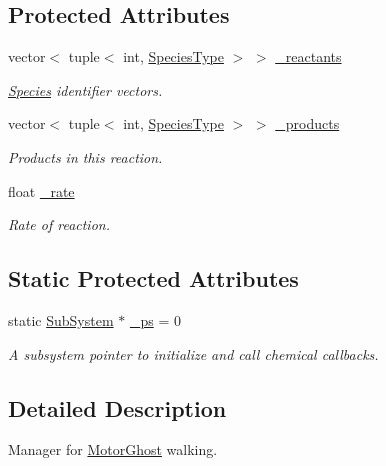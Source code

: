 \subsection*{Protected Attributes}
\begin{DoxyCompactItemize}
\item 
vector$<$ tuple$<$ int, \hyperlink{Species_8h_a50651af47c56ea0e27235468d23542cf}{Species\+Type} $>$ $>$ \hyperlink{classInternalFilamentRxnManager_a63de9061c3da4ad03cf4c530d2774979}{\+\_\+reactants}
\begin{DoxyCompactList}\small\item\em \hyperlink{classSpecies}{Species} identifier vectors. \end{DoxyCompactList}\item 
vector$<$ tuple$<$ int, \hyperlink{Species_8h_a50651af47c56ea0e27235468d23542cf}{Species\+Type} $>$ $>$ \hyperlink{classInternalFilamentRxnManager_afd213da1a3706e2e88962e5da886a5dc}{\+\_\+products}
\begin{DoxyCompactList}\small\item\em Products in this reaction. \end{DoxyCompactList}\item 
float \hyperlink{classInternalFilamentRxnManager_a8b98dd9e6f5d016149f5434b891806df}{\+\_\+rate}
\begin{DoxyCompactList}\small\item\em Rate of reaction. \end{DoxyCompactList}\end{DoxyCompactItemize}
\subsection*{Static Protected Attributes}
\begin{DoxyCompactItemize}
\item 
static \hyperlink{classSubSystem}{Sub\+System} $\ast$ \hyperlink{classInternalFilamentRxnManager_a973ce9cc2aae811e6867afa46193c5f2}{\+\_\+ps} = 0
\begin{DoxyCompactList}\small\item\em A subsystem pointer to initialize and call chemical callbacks. \end{DoxyCompactList}\end{DoxyCompactItemize}


\subsection{Detailed Description}
Manager for \hyperlink{classMotorGhost}{Motor\+Ghost} walking. 

